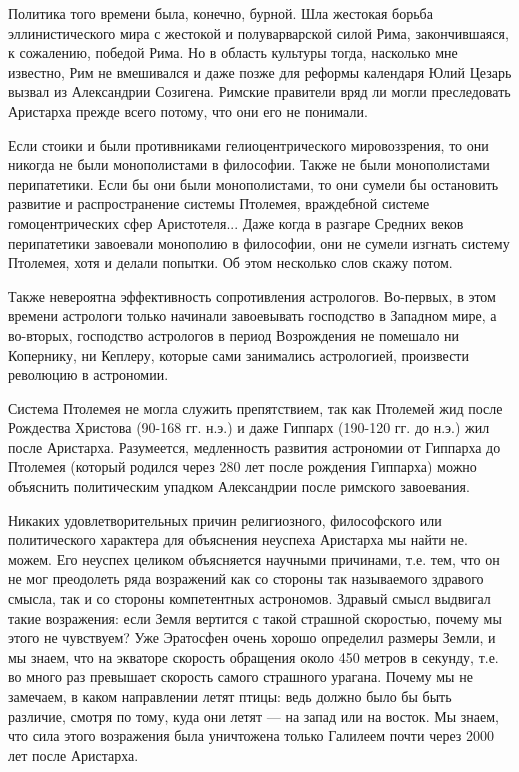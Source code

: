 Политика того времени была, конечно, бурной. Шла жестокая борьба
эллинистического мира с жестокой и полуварварской силой Рима,
закончившаяся, к сожалению, победой Рима. Но в область культуры тогда,
насколько мне известно, Рим не вмешивался и даже позже для реформы
календаря Юлий Цезарь вызвал из Александрии Созигена. Римские
правители вряд ли могли преследовать Аристарха прежде всего потому,
что они его не понимали.

Если стоики и были противниками гелиоцентрического мировоззрения, то
они никогда не были монополистами в философии. Также не были
монополистами перипатетики. Если бы они были монополистами, то они
сумели бы остановить развитие и распространение системы Птолемея,
враждебной системе гомоцентрических сфер Аристотеля... Даже когда в
разгаре Средних веков перипатетики завоевали монополию в философии,
они не сумели изгнать систему Птолемея, хотя и делали попытки. Об этом
несколько слов скажу потом.

Также невероятна эффективность сопротивления астрологов. Во-первых, в
этом времени астрологи только начинали завоевывать господство в
Западном мире, а во-вторых, господство астрологов в период Возрождения
не помешало ни Копернику, ни Кеплеру, которые сами занимались
астрологией, произвести революцию в астрономии.

Система Птолемея не могла служить препятствием, так как Птолемей жид
после Рождества Христова (90-168 гг. н.э.) и даже Гиппарх (190-120
гг. до н.э.) жил после Аристарха. Разумеется, медленность развития
астрономии от Гиппарха до Птолемея (который родился через 280 лет
после рождения Гиппарха) можно объяснить политическим упадком
Александрии после римского завоевания.

Никаких удовлетворительных причин религиозного, философского или
политического характера для объяснения неуспеха Аристарха мы найти не.
можем. Его неуспех целиком объясняется научными причинами, т.е. тем,
что он не мог преодолеть ряда возражений как со стороны так
называемого здравого смысла, так и со стороны компетентных астрономов.
Здравый смысл выдвигал такие возражения: если Земля вертится с такой
страшной скоростью, почему мы этого не чувствуем? Уже Эратосфен очень
хорошо определил размеры Земли, и мы знаем, что на экваторе скорость
обращения около 450 метров в секунду, т.е. во много раз превышает
скорость самого страшного урагана. Почему мы не замечаем, в каком
направлении летят птицы: ведь должно было бы быть различие, смотря по
тому, куда они летят --- на запад или на восток. Мы знаем, что сила
этого возражения была уничтожена только Галилеем почти через 2000 лет
после Аристарха.

